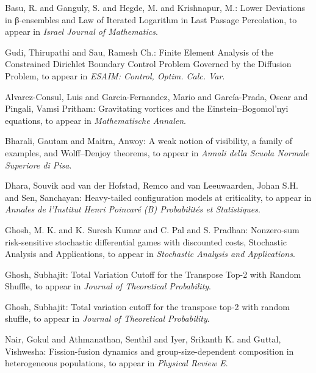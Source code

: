 \item Basu, R. and Ganguly, S. and Hegde, M. and Krishnapur, M.: Lower Deviations in β-ensembles and Law of Iterated Logarithm in Last Passage Percolation, to appear in \emph{Israel Journal of Mathematics}.


\item Gudi, Thirupathi and  Sau, Ramesh Ch.: Finite Element Analysis of the Constrained Dirichlet Boundary Control Problem Governed by the Diffusion Problem, to appear in \emph{ESAIM: Control, Optim. Calc. Var}.

\item Alvarez-Consul, Luis and Garcia-Fernandez, Mario  and García-Prada, Oscar and Pingali, Vamsi Pritham: Gravitating vortices and the Einstein–Bogomol’nyi equations, to appear in \emph{Mathematische Annalen}.

\item\label{bharali:Wolff-Denjoy} Bharali, Gautam and Maitra, Anwoy: A weak notion of visibility,
      a family of examples, and Wolff--Denjoy theorems, to appear in \emph{Annali della Scuola Normale Superiore di Pisa}.

\item\label{sen:models-at-criticality} Dhara, Souvik and van der Hofstad, Remco and van Leeuwaarden, Johan S.H. and Sen, Sanchayan: Heavy-tailed configuration models at criticality, to appear in {\em Annales de l'Institut Henri
              Poincar\'e (B) Probabilit\'es et Statistiques}.

\item Ghosh, M. K. and K. Suresh Kumar and C. Pal and S. Pradhan: Nonzero-sum risk-sensitive stochastic differential games with discounted costs, Stochastic Analysis and Applications, to appear in \emph{Stochastic Analysis and Applications}.

\item Ghosh, Subhajit: Total Variation Cutoff for the Transpose Top-2 with Random Shuffle, to appear in \emph{Journal of Theoretical Probability}.

\item Ghosh, Subhajit: Total variation cutoff for the transpose top-2 with random shuffle, to appear in {\em Journal of Theoretical Probability}.

\item\label{iyer:heterogeneous-populations} Nair, Gokul and Athmanathan, Senthil and Iyer, Srikanth K. and Guttal, Vishwesha: Fission-fusion dynamics and group-size-dependent composition in heterogeneous populations,
      to appear in {\em Physical Review E}.

